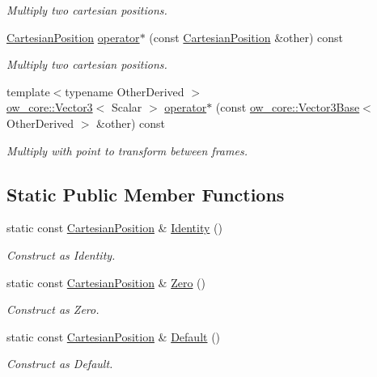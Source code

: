 \begin{DoxyCompactItemize}
\begin{DoxyCompactList}\small\item\em Multiply two cartesian positions. \end{DoxyCompactList}\item 
\hyperlink{classow__core_1_1CartesianPosition}{Cartesian\+Position} \hyperlink{classow__core_1_1CartesianPosition_aa3ef68ee8c7005574e06b8bfce15c551}{operator$\ast$} (const \hyperlink{classow__core_1_1CartesianPosition}{Cartesian\+Position} \&other) const \hypertarget{classow__core_1_1CartesianPosition_aa3ef68ee8c7005574e06b8bfce15c551}{}\label{classow__core_1_1CartesianPosition_aa3ef68ee8c7005574e06b8bfce15c551}

\begin{DoxyCompactList}\small\item\em Multiply two cartesian positions. \end{DoxyCompactList}\item 
{\footnotesize template$<$typename Other\+Derived $>$ }\\\hyperlink{classow__core_1_1Vector3}{ow\+\_\+core\+::\+Vector3}$<$ Scalar $>$ \hyperlink{classow__core_1_1CartesianPosition_a788a85242af6a00dd908c21a801c649e}{operator$\ast$} (const \hyperlink{classow__core_1_1Vector3Base}{ow\+\_\+core\+::\+Vector3\+Base}$<$ Other\+Derived $>$ \&other) const 
\begin{DoxyCompactList}\small\item\em Multiply with point to transform between frames. \end{DoxyCompactList}\end{DoxyCompactItemize}
\subsection*{Static Public Member Functions}
\begin{DoxyCompactItemize}
\item 
static const \hyperlink{classow__core_1_1CartesianPosition}{Cartesian\+Position} \& \hyperlink{classow__core_1_1CartesianPosition_adf7c4725b0e7c01554d431f1277b7380}{Identity} ()
\begin{DoxyCompactList}\small\item\em Construct as Identity. \end{DoxyCompactList}\item 
static const \hyperlink{classow__core_1_1CartesianPosition}{Cartesian\+Position} \& \hyperlink{classow__core_1_1CartesianPosition_a58f4841421e4711b905ef7cdd4d5b8d8}{Zero} ()
\begin{DoxyCompactList}\small\item\em Construct as Zero. \end{DoxyCompactList}\item 
static const \hyperlink{classow__core_1_1CartesianPosition}{Cartesian\+Position} \& \hyperlink{classow__core_1_1CartesianPosition_acd8dec83eb36d0042810e9917f9ab52f}{Default} ()
\begin{DoxyCompactList}\small\item\em Construct as Default. \end{DoxyCompactList}\end{DoxyCompactItemize}


